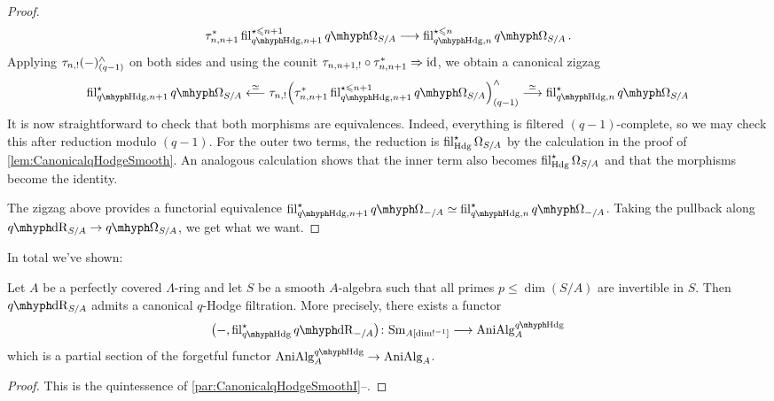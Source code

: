 \documentclass[DIV=12,numbers=enddot,leqno,bibliography=totoc]{scrartcl}
\begin{document}
\begin{proof}
		\begin{equation*}
			\tau_{n,n+1}^*\fil_{\qHodge,n+1}^{\star\leqslant n+1}\qOmega_{S/A}\longrightarrow \fil_{\qHodge,n}^{\star\leqslant n}\qOmega_{S/A}\,.
		\end{equation*}
		Applying $\tau_{n,!}(-)_{(q-1)}^\wedge$ on both sides and using the counit $\tau_{n,n+1,!}\circ\tau_{n,n+1}^*\Rightarrow \operatorname{id}$, we obtain a canonical zigzag
		\begin{equation*}
			\fil_{\qHodge,n+1}^\star\qOmega_{S/A}\overset{\simeq}{\longleftarrow} \tau_{n,!}\left(\tau_{n,n+1}^*\fil_{\qHodge,n+1}^{\star\leqslant n+1}\qOmega_{S/A}\right)_{(q-1)}^\complete\overset{\simeq}{\longrightarrow} \fil_{\qHodge,n}^\star\qOmega_{S/A}
		\end{equation*}
		It is now straightforward to check that both morphisms are equivalences. Indeed, everything is filtered $(q-1)$-complete, so we may check this after reduction modulo $(q-1)$. For the outer two terms, the reduction is $\operatorname{fil}_{\mathrm{Hdg}}^\star\Omega_{S/A}$ by the calculation in the proof of \cref{lem:CanonicalqHodgeSmooth}. An analogous calculation shows that the inner term also becomes $\operatorname{fil}_{\mathrm{Hdg}}^\star\Omega_{S/A}$ and that the morphisms become the identity.
		
		The zigzag above provides a functorial equivalence $\fil_{\qHodge,n+1}^\star\qOmega_{-/A}\simeq \fil_{\qHodge,n}^\star\qOmega_{-/A}$. Taking the pullback along $\qdeRham_{S/A}\rightarrow \qOmega_{S/A}$, we get what we want.
	\end{proof}
	
	In total we've shown:
	
	\begin{thm}\label{thm:CanonicalqHodgeSmooth}
		Let $A$ be a perfectly covered $\Lambda$-ring and let $S$ be a smooth $A$-algebra such that all primes $p\leqslant \dim(S/A)$ are invertible in $S$. Then $\qdeRham_{S/A}$ admits a canonical $q$-Hodge filtration. More precisely, there exists a functor
		\begin{equation*}
			\bigl(-,\fil_{\qHodge}^\star\qdeRham_{-/A}\bigr)\colon \cat{Sm}_{A[\dim!^{-1}]}\longrightarrow \cat{AniAlg}_A^{\qHodge}
		\end{equation*}
		which is a partial section of the forgetful functor $\cat{AniAlg}_A^{\qHodge}\rightarrow \cat{AniAlg}_A$.
	\end{thm}
	\begin{proof}
		This is the quintessence of \cref{par:CanonicalqHodgeSmoothI}--.
	\end{proof}
	
\end{document}
